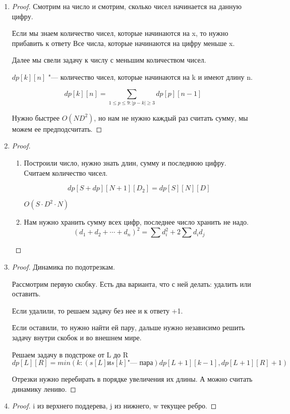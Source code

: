 \begin{enumerate}
\begin{proof}
    $$dp[i][j] = 2$$
    $$dp[i][j] = max_k dp[j][k] + 1 (k \colon a_j < \frac{a_k + a_i}{2}) $$
    \end{proof}
\item 
    \begin{proof}
    Смотрим на число и смотрим, сколько чисел начинается на данную цифру. 

    Если мы знаем количество чисел, которые начинаются на x, то нужно прибавить к ответу 
    Все числа, которые начинаются на цифру меньше x.

    Далее мы свели задачу к числу с меньшим количеством чисел. 
    
    $dp[k][n]$ "---  количество чисел, которые начинаются на k и имеют длину n.

    $$dp[k][n] = \sum_{1 \le p \le 9 \colon |p - k| \ge 3} dp[p][n - 1]$$

    Нужно быстрее $O(N D^2)$, но нам не нужно каждый раз считать 
    сумму, мы можем ее предподсчитать.

    \end{proof}
\item
    \begin{proof}
    \begin{enumerate}
    \item 
    Построили число, нужно знать длин, сумму и последнюю цифру. Считаем количество чисел. 

    $$dp[S + dp][N + 1][D_2] = dp[S][N][D]$$

    $O(S \cdot D^2 \cdot N)$
    \item Нам нужно хранить сумму всех цифр, последнее число хранить не надо. 
    $$(d_1 + d_2 + \cdots + d_n)^2 = \sum d_i^2 + 2 \sum d_i d_j $$
    \end{enumerate}
    \end{proof} 
\item 
\begin{proof}
Динамика по подотрезкам. 

Рассмотрим первую скобку. Есть два варианта, что с ней делать: удалить или оставить.

Если удалили, то решаем задачу без нее и к ответу +1.

Если оставили, то нужно найти ей пару, дальше нужно независимо решить задачу внутри скобок и во внешнем мире.

Решаем задачу в подстроке от L до R
$$dp[L][R] = min(k \colon (s[L] \text{и} s[k] \text{"--- пара}) dp[L + 1][k - 1], dp[L + 1][R] + 1)$$

Отрезки нужно перебирать в порядке увеличения их длины.  А можно считать динамику лениво. 
\end{proof}
\item 
\begin{proof}
i из верхнего поддерева, j  из нижнего, w текущее ребро.


\end{proof}
\end{enumerate}
